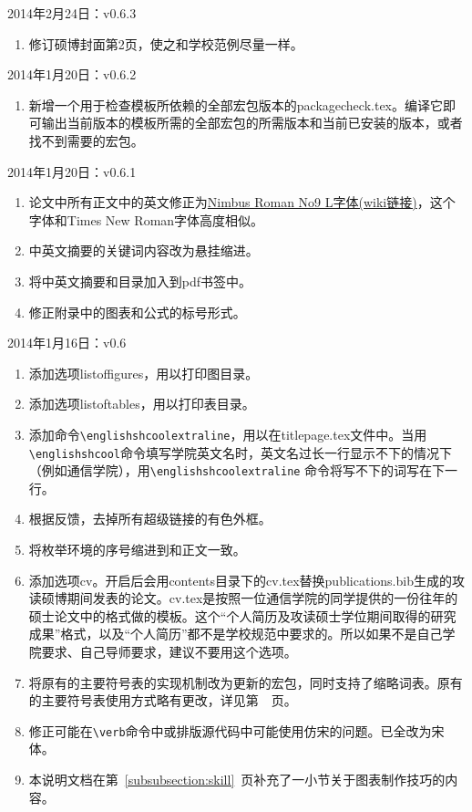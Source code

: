 \noindent
2014年2月24日：v0.6.3
\begin{enumerate}
\item 修订硕博封面第2页，使之和学校范例尽量一样。

\end{enumerate}

\noindent
2014年1月20日：v0.6.2
\begin{enumerate}
\item 新增一个用于检查模板所依赖的全部宏包版本的packagecheck.tex。编译它即可输出当前版本的模板所需的全部宏包的所需版本和当前已安装的版本，或者找不到需要的宏包。

\end{enumerate}

\noindent
2014年1月20日：v0.6.1
\begin{enumerate}
\item 论文中所有正文中的英文修正为\href{http://en.wikipedia.org/wiki/Nimbus_Roman_No9_L}{Nimbus Roman No9 L字体(wiki链接)}，这个字体和Times New Roman字体高度相似。
\item 中英文摘要的关键词内容改为悬挂缩进。
\item 将中英文摘要和目录加入到pdf书签中。
\item 修正附录中的图表和公式的标号形式。

\end{enumerate}

\noindent
2014年1月16日：v0.6
\begin{enumerate}
\item 添加选项listoffigures，用以打印图目录。
\item 添加选项listoftables，用以打印表目录。
\item 添加命令\verb|\englishshcoolextraline|，用以在titlepage.tex文件中。当用\\ \verb|\englishshcool|命令填写学院英文名时，英文名过长一行显示不下的情况下（例如通信学院），用\verb|\englishshcoolextraline| 命令将写不下的词写在下一行。
\item 根据反馈，去掉所有超级链接的有色外框。
\item 将枚举环境的序号缩进到和正文一致。
\item 添加选项cv。开启后会用contents目录下的cv.tex替换publications.bib生成的攻读硕博期间发表的论文。cv.tex是按照一位通信学院的同学提供的一份往年的硕士论文中的格式做的模板。这个“个人简历及攻读硕士学位期间取得的研究成果”格式，以及“个人简历”都不是学校规范中要求的。所以如果不是自己学院要求、自己导师要求，建议不要用这个选项。
\item 将原有的主要符号表的实现机制改为更新的宏包，同时支持了缩略词表。原有的主要符号表使用方式略有更改，详见第~\pageref{subsection:glossaries}~页。
\item 修正可能在\verb|\verb|命令中或排版源代码中可能使用仿宋的问题。已全改为宋体。
\item 本说明文档在第~\ref{subsubsection:skill}~页补充了一小节关于图表制作技巧的内容。
\end{enumerate}


